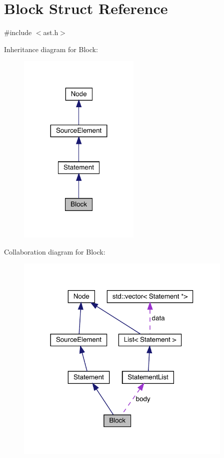 \hypertarget{struct_block}{}\section{Block Struct Reference}
\label{struct_block}


{\ttfamily \#include $<$ast.\+h$>$}



Inheritance diagram for Block\+:\nopagebreak
\begin{figure}[H]
\begin{center}
\leavevmode
\includegraphics[width=164pt]{struct_block__inherit__graph}
\end{center}
\end{figure}


Collaboration diagram for Block\+:\nopagebreak
\begin{figure}[H]
\begin{center}
\leavevmode
\includegraphics[width=294pt]{struct_block__coll__graph}
\end{center}
\end{figure}
